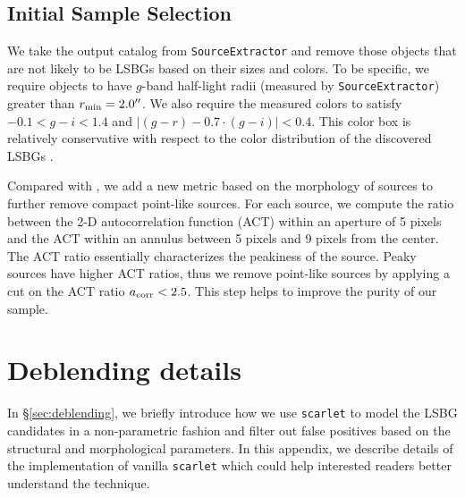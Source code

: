 \documentclass[twocolumn,astrosymb,twocolappendix]{aastex631}
\newcommand{\code}[1]{\texttt{#1}}
\begin{document}
\begin{CJK*}{UTF8}{gbsn}
\subsection{Initial Sample Selection} 
We take the output catalog from \code{SourceExtractor} and remove those objects that are not likely to be LSBGs based on their sizes and colors. To be specific, we require objects to have $g$-band half-light radii (measured by \code{SourceExtractor}) greater than $r_{\rm min} = 2.0\mbox{$^{\prime\prime}$}$. We also require the measured colors to satisfy $-0.1 < g-i < 1.4$ and $|(g-r) - 0.7\cdot (g-i)| < 0.4$. This color box is relatively conservative with respect to the color distribution of the discovered LSBGs \citep[e.g.,][]{SAGA-I,Greco2018,Zaritsky2019,Tanoglidis2021}. 

Compared with , we add a new metric based on the morphology of sources to further remove compact point-like sources. For each source, we compute the ratio between the 2-D autocorrelation function (ACT) within an aperture of 5 pixels and the ACT within an annulus between 5 pixels and 9 pixels from the center. The ACT ratio essentially characterizes the peakiness of the source. Peaky sources have higher ACT ratios, thus we remove point-like sources by applying a cut on the ACT ratio $a_{\rm corr} < 2.5$. This step helps to improve the purity of our sample.


\section{Deblending details}\label{ap:deblending}
In \S\ref{sec:deblending}, we briefly introduce how we use \code{scarlet} to model the LSBG candidates in a non-parametric fashion and filter out false positives based on the structural and morphological parameters. In this appendix, we describe details of the implementation of vanilla \code{scarlet} which could help interested readers better understand the technique.


\end{CJK*}
\end{document}
